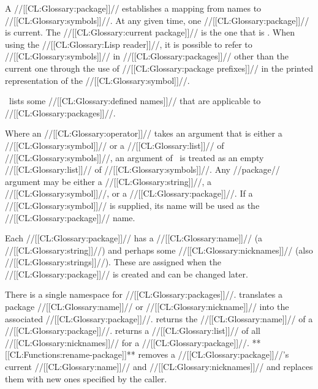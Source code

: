 


A //[[CL:Glossary:package]]// establishes a mapping from names to //[[CL:Glossary:symbols]]//.  At any given time, one //[[CL:Glossary:package]]// is current. The //[[CL:Glossary:current package]]// is the one that is . When using the //[[CL:Glossary:Lisp reader]]//, it is possible to refer to //[[CL:Glossary:symbols]]// in //[[CL:Glossary:packages]]//  other than the current one through the use of //[[CL:Glossary:package prefixes]]// in the  printed representation of the //[[CL:Glossary:symbol]]//.

\Thenextfigure\ lists some //[[CL:Glossary:defined names]]// that are applicable to //[[CL:Glossary:packages]]//.

Where an //[[CL:Glossary:operator]]//  takes an argument that is either a //[[CL:Glossary:symbol]]// or a //[[CL:Glossary:list]]//  of //[[CL:Glossary:symbols]]//, an argument of \nil\ is treated as an empty //[[CL:Glossary:list]]// of //[[CL:Glossary:symbols]]//. Any //package// argument may be either a //[[CL:Glossary:string]]//, a //[[CL:Glossary:symbol]]//, or a //[[CL:Glossary:package]]//.  If a //[[CL:Glossary:symbol]]// is supplied, its name will be used as the //[[CL:Glossary:package]]// name. 



Each //[[CL:Glossary:package]]// has a //[[CL:Glossary:name]]// (a //[[CL:Glossary:string]]//) and perhaps some //[[CL:Glossary:nicknames]]// (also //[[CL:Glossary:strings]]//). These are assigned when the //[[CL:Glossary:package]]// is created and can be changed later.  

There is a single namespace for //[[CL:Glossary:packages]]//.    translates a package //[[CL:Glossary:name]]// or //[[CL:Glossary:nickname]]// into the associated //[[CL:Glossary:package]]//.    returns the //[[CL:Glossary:name]]// of a //[[CL:Glossary:package]]//.    returns  a //[[CL:Glossary:list]]// of all //[[CL:Glossary:nicknames]]// for a //[[CL:Glossary:package]]//. **[[CL:Functions:rename-package]]** removes a //[[CL:Glossary:package]]//'s current //[[CL:Glossary:name]]// and //[[CL:Glossary:nicknames]]// and replaces them with new ones specified by the caller.

